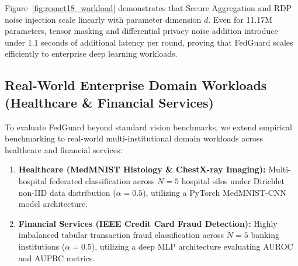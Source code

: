 Figure~\ref{fig:resnet18_workload} demonstrates that Secure Aggregation and RDP noise injection scale linearly with parameter dimension $d$. Even for 11.17M parameters, tensor masking and differential privacy noise addition introduce under 1.1 seconds of additional latency per round, proving that FedGuard scales efficiently to enterprise deep learning workloads.

\subsection{Real-World Enterprise Domain Workloads (Healthcare \& Financial Services)}

To evaluate FedGuard beyond standard vision benchmarks, we extend empirical benchmarking to real-world multi-institutional domain workloads across healthcare and financial services:
\begin{enumerate}
    \item \textbf{Healthcare (MedMNIST Histology \& ChestX-ray Imaging):} Multi-hospital federated classification across $N=5$ hospital silos under Dirichlet non-IID data distribution ($\alpha=0.5$), utilizing a PyTorch MedMNIST-CNN model architecture.
    \item \textbf{Financial Services (IEEE Credit Card Fraud Detection):} Highly imbalanced tabular transaction fraud classification across $N=5$ banking institutions ($\alpha=0.5$), utilizing a deep MLP architecture evaluating AUROC and AUPRC metrics.
\end{enumerate}

\begin{table}[htbp]
\caption{Empirical Performance on Real-World Enterprise Domain Datasets}
\begin{center}
\label{tab:domain_datasets}
\end{center}
\end{table}

